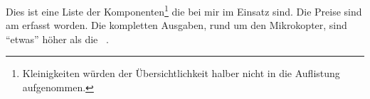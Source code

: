 Dies ist eine Liste der Komponenten\footnote{Kleinigkeiten würden der Übersichtlichkeit halber nicht in die Auflistung
aufgenommen.} die bei mir im Einsatz sind.
Die Preise sind am  erfasst worden.
Die kompletten Ausgaben, rund um den Mikrokopter, sind \enquote{etwas} höher als die \Gesamtsumme ~.
